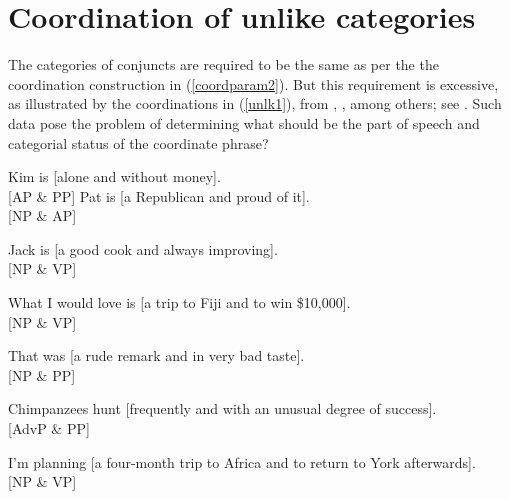 {\section{Coordination of unlike categories}\label{unlikessec}


The categories of conjuncts are required to be the same as per the the coordination construction in (\ref{coordparam2}).
But this requirement is excessive, as illustrated by  the coordinations in (\ref{unlk1}), from
\citet[]{bayer}, %
\citet[]{rodney}, %
among  others; see \citet{bookivan}.
 Such data pose the  problem of determining  what should be the part of speech and categorial status of the coordinate phrase?

\begin{exe}
\ex \begin{xlista}
\ex Kim is  [alone and without money].\\
 \hfill [AP \& PP]
\ex  Pat is [a Republican and proud of it]. \\
 \hfill [NP \& AP]

\ex  Jack is [a good cook and always improving].\\ \hfill [NP \& VP]

\ex What I would love is [a trip to Fiji and to win \$10,000].\\
\hfill [NP \& VP]

\ex  That was [a rude remark and in very bad taste]. \\
\hfill [NP \& PP]

\ex Chimpanzees hunt [frequently and with an unusual degree of success].\\
\hfill [AdvP \& PP]

\ex I'm  planning [a four-month trip to Africa and  to return to York afterwards].\\
\hfill [NP \& VP]
 \end{xlista}\label{unlk1}
\end{exe}


}
